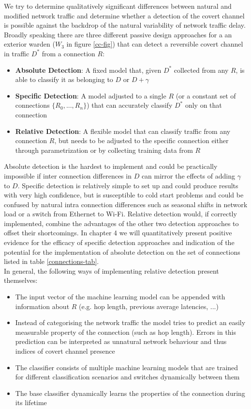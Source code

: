 \documentclass[12pt,a4paper,automark, toc=bib]{scrreprt}
\theoremstyle{definition}
\begin{document}
			\label{assessment}
			\label{assessment2}
			We try to determine qualitatively significant differences between natural and modified network traffic and determine whether a detection of the covert channel is possible against the backdrop of the natural variability of network traffic delay. Broadly speaking there are three different passive design approaches for a an exterior warden ($W_3$ in figure \ref{cc-fig}) that can detect  a reversible covert channel in traffic $D^*$ from a connection $R$:
			\begin{itemize}
				\item \textbf{Absolute Detection}: A fixed model that, given $D^*$ collected from any $R$, is able to classify it as belonging to $D$ or $D + \gamma$
				\item \textbf{Specific Detection}: A model adjusted to a single $R$ (or a constant set of connections $\{R_0, ..., R_n\}$) that can accurately classify $D^*$ only on that connection
				\item \textbf{Relative Detection}: A flexible model that can classify traffic from any connection $R$, but needs to be adjusted to the specific connection either through parametrization or by collecting training data from $R$
			\end{itemize}
			Absolute detection is the hardest to implement and could be practically impossible if inter connection differences in $D$ can mirror the effects of adding $\gamma$ to $D$. Specific detection is relatively simple to set up and could produce results with very high confidence, but is susceptible to cold start problems and could be confused by natural intra connection differences such as seasonal shifts in network load or a switch from Ethernet to Wi-Fi. Relative detection would, if  correctly implemented, combine the advantages of the other two detection approaches to offset their shortcomings. In chapter 4 we will quantitatively present positive evidence for the efficacy of specific detection approaches and  indication of the potential for the implementation of absolute detection on the set of connections listed in table \ref{connections-tab}. \\
			In general, the following ways of implementing relative detection present themselves:
			\begin{itemize}
				\item The input vector of the machine learning model can be appended with information about $R$ (e.g. hop length, previous average latencies, ...)
				\item Instead of categorising the network traffic the model tries to predict an easily measurable property of the connection (such as hop length). Errors in this prediction can be interpreted as unnatural network behaviour and thus indices of covert channel presence
				\item The classifier consists of multiple machine learning models that are trained for different classification scenarios and switches dynamically between them
				\item The base classifier dynamically learns the properties of the connection during its lifetime 
			\end{itemize}
\end{document}
